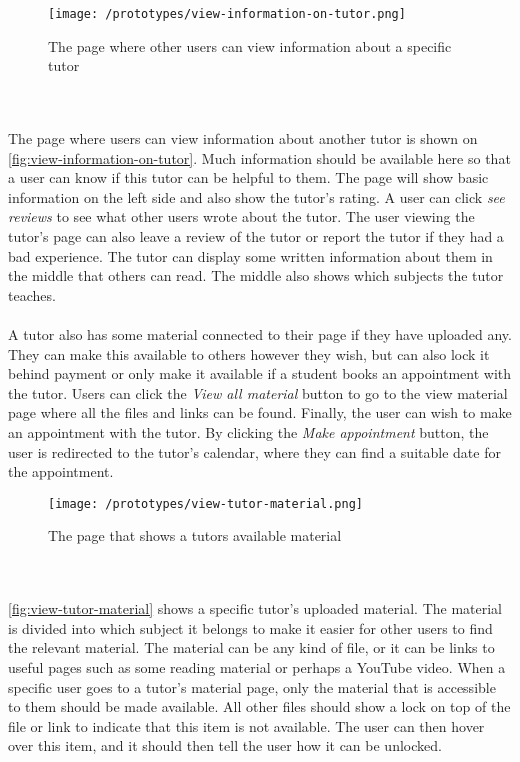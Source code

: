  \begin{figure}[]
    \texttt{[image: /prototypes/view-information-on-tutor.png]}
     \caption{The page where other users can view information about a specific tutor}
     \label{fig:view-information-on-tutor}
 \end{figure}
 \noindent
 \\\\
The page where users can view information about another tutor is shown on \autoref{fig:view-information-on-tutor}. 
Much information should be available here so that a user can know if this tutor can be helpful to them.
The page will show basic information on the left side and also show the tutor's rating. 
A user can click \textit{see reviews} to see what other users wrote about the tutor. 
The user viewing the tutor's page can also leave a review of the tutor or report the tutor if they had a bad experience. 
The tutor can display some written information about them in the middle that others can read. 
The middle also shows which subjects the tutor teaches. 
\\\\
A tutor also has some material connected to their page if they have uploaded any. 
They can make this available to others however they wish, but can also lock it behind payment or only make it available if a student books an appointment with the tutor.
Users can click the \textit{View all material} button to go to the view material page where all the files and links can be found. 
Finally, the user can wish to make an appointment with the tutor. 
By clicking the \textit{Make appointment} button, the user is redirected to the tutor's calendar, where they can find a suitable date for the appointment. 
 \begin{figure}[]
    \texttt{[image: /prototypes/view-tutor-material.png]}
     \caption{The page that shows a tutors available material}
     \label{fig:view-tutor-material}
 \end{figure}
 \noindent
 \\\\
\autoref{fig:view-tutor-material} shows a specific tutor's uploaded material. 
The material is divided into which subject it belongs to make it easier for other users to find the relevant material. 
The material can be any kind of file, or it can be links to useful pages such as some reading material or perhaps a YouTube video. 
When a specific user goes to a tutor's material page, only the material that is accessible to them should be made available. 
All other files should show a lock on top of the file or link to indicate that this item is not available. 
The user can then hover over this item, and it should then tell the user how it can be unlocked. 

